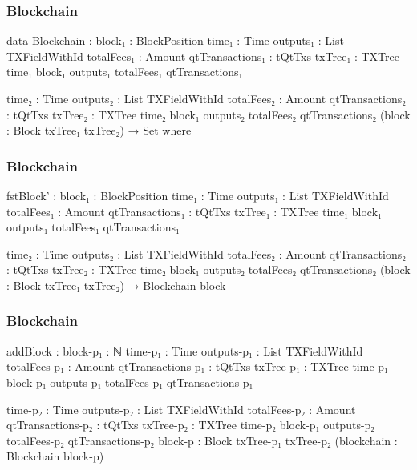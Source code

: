 \documentclass{beamer}
\begin{document}
\begin{frame}
  \frametitle{Blockchain}
\begin{code}

      data Blockchain :
        {block₁ : BlockPosition}
        {time₁ : Time}
        {outputs₁ : List TXFieldWithId}
        {totalFees₁ : Amount}
        {qtTransactions₁ : tQtTxs}
        {txTree₁ : TXTree time₁ block₁ outputs₁
          totalFees₁ qtTransactions₁}

        {time₂ : Time}
        {outputs₂ : List TXFieldWithId}
        {totalFees₂ : Amount}
        {qtTransactions₂ : tQtTxs}
        {txTree₂ : TXTree time₂ block₁ outputs₂ totalFees₂
          qtTransactions₂}
        (block : Block txTree₁ txTree₂)
        → Set where

\end{code}
\end{frame}
\begin{frame}
  \frametitle{Blockchain}
\begin{code}

          fstBlock' :
            {block₁ : BlockPosition}
            {time₁ : Time}
            {outputs₁ : List TXFieldWithId}
            {totalFees₁ : Amount}
            {qtTransactions₁ : tQtTxs}
            {txTree₁ : TXTree time₁ block₁ outputs₁ totalFees₁
              qtTransactions₁}

            {time₂ : Time}
            {outputs₂ : List TXFieldWithId}
            {totalFees₂ : Amount}
            {qtTransactions₂ : tQtTxs}
            {txTree₂ : TXTree time₂ block₁ outputs₂ totalFees₂
              qtTransactions₂}
            (block : Block txTree₁ txTree₂)
            → Blockchain block

\end{code}
\end{frame}
\begin{frame}
  \frametitle{Blockchain}
\begin{code}

          addBlock :
            {block-p₁ : ℕ}
            {time-p₁ : Time}
            {outputs-p₁ : List TXFieldWithId}
            {totalFees-p₁ : Amount}
            {qtTransactions-p₁ : tQtTxs}
            {txTree-p₁ : TXTree time-p₁ block-p₁
              outputs-p₁ totalFees-p₁ qtTransactions-p₁}

            {time-p₂ : Time}
            {outputs-p₂ : List TXFieldWithId}
            {totalFees-p₂ : Amount}
            {qtTransactions-p₂ : tQtTxs}
            {txTree-p₂ : TXTree time-p₂ block-p₁
              outputs-p₂ totalFees-p₂ qtTransactions-p₂}
            {block-p : Block txTree-p₁ txTree-p₂}
            (blockchain : Blockchain block-p)

\end{code}
\end{frame}
\end{document}
